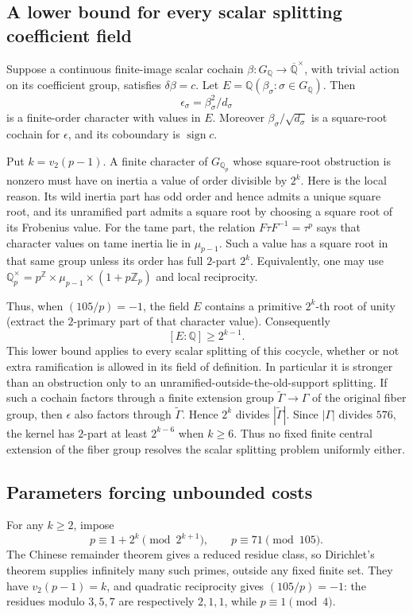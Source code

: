 \subsection{A lower bound for every scalar splitting coefficient field}
Suppose a continuous finite-image scalar cochain
$\beta:G_{\mathbb Q}\to\overline{\mathbb Q}^{\times}$, with trivial
action on its coefficient group, satisfies $\delta\beta=c$.
Let $E=\mathbb Q(\beta_\sigma:\sigma\in G_{\mathbb Q})$. Then
\[
 \epsilon_\sigma=\beta_\sigma^2/d_\sigma
\]
is a finite-order character with values in $E$. Moreover
$\beta_\sigma/\sqrt{d_\sigma}$ is a square-root cochain for
$\epsilon$, and its coboundary is $\operatorname{sign}c$.

Put $k=v_2(p-1)$. A finite character of $G_{\mathbb Q_p}$ whose
square-root obstruction is nonzero must have on inertia a value of
order divisible by $2^k$. Here is the local reason. Its wild inertia
part has odd order and hence admits a unique square root, and its
unramified part admits a square root by choosing a square root of its
Frobenius value. For the tame part, the relation
$F\tau F^{-1}=\tau^p$ says that character values on tame inertia lie
in $\mu_{p-1}$. Such a value has a square root in that same group
unless its order has full $2$-part $2^k$. Equivalently, one may use
$\mathbb Q_p^\times=p^{\mathbb Z}\times\mu_{p-1}\times(1+p\mathbb Z_p)$
and local reciprocity.

Thus, when $(105/p)=-1$, the field $E$ contains a primitive
$2^k$-th root of unity (extract the $2$-primary part of that character
value). Consequently
\begin{equation}\label{eq:coefficient-field-obstruction}
 [E:\mathbb Q]\ge2^{k-1}.
\end{equation}
This lower bound applies to every scalar splitting of this cocycle,
whether or not extra ramification is allowed in its field of definition.
In particular it is stronger than an obstruction only to an
unramified-outside-the-old-support splitting.
If such a cochain factors through a finite extension group
$\widetilde\Gamma\to\Gamma$ of the original fiber group, then
$\epsilon$ also factors through $\widetilde\Gamma$. Hence
$2^k$ divides $|\widetilde\Gamma|$. Since $|\Gamma|$ divides $576$,
the kernel has $2$-part at least $2^{k-6}$ when $k\ge6$.
Thus no fixed finite central extension of the fiber group resolves
the scalar splitting problem uniformly either.

\subsection{Parameters forcing unbounded costs}
For any $k\ge2$, impose
\[
 p\equiv1+2^k\pmod{2^{k+1}},\qquad p\equiv71\pmod{105}.
\]
The Chinese remainder theorem gives a reduced residue class, so
Dirichlet's theorem supplies infinitely many such primes, outside
any fixed finite set. They have $v_2(p-1)=k$, and quadratic reciprocity
gives $(105/p)=-1$: the residues modulo $3,5,7$ are respectively
$2,1,1$, while $p\equiv1\pmod4$.

